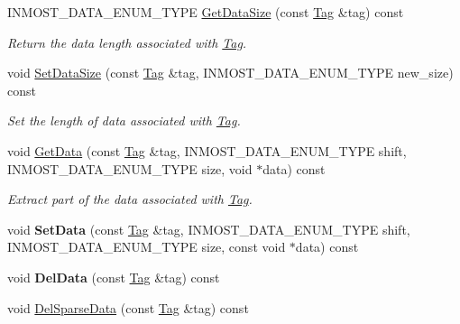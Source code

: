 \begin{DoxyCompactItemize}
\item 
I\-N\-M\-O\-S\-T\-\_\-\-D\-A\-T\-A\-\_\-\-E\-N\-U\-M\-\_\-\-T\-Y\-P\-E \hyperlink{classINMOST_1_1Storage_a0c416b8e55014921426055508deca124}{Get\-Data\-Size} (const \hyperlink{classINMOST_1_1Tag}{Tag} \&tag) const 
\begin{DoxyCompactList}\small\item\em Return the data length associated with \hyperlink{classINMOST_1_1Tag}{Tag}. \end{DoxyCompactList}\item 
void \hyperlink{classINMOST_1_1Storage_af834468fb65cd43e272502985c050820}{Set\-Data\-Size} (const \hyperlink{classINMOST_1_1Tag}{Tag} \&tag, I\-N\-M\-O\-S\-T\-\_\-\-D\-A\-T\-A\-\_\-\-E\-N\-U\-M\-\_\-\-T\-Y\-P\-E new\-\_\-size) const 
\begin{DoxyCompactList}\small\item\em Set the length of data associated with \hyperlink{classINMOST_1_1Tag}{Tag}. \end{DoxyCompactList}\item 
void \hyperlink{classINMOST_1_1Storage_ae5dc4f3507b7f327fb29ae48311a4eea}{Get\-Data} (const \hyperlink{classINMOST_1_1Tag}{Tag} \&tag, I\-N\-M\-O\-S\-T\-\_\-\-D\-A\-T\-A\-\_\-\-E\-N\-U\-M\-\_\-\-T\-Y\-P\-E shift, I\-N\-M\-O\-S\-T\-\_\-\-D\-A\-T\-A\-\_\-\-E\-N\-U\-M\-\_\-\-T\-Y\-P\-E size, void $\ast$data) const 
\begin{DoxyCompactList}\small\item\em Extract part of the data associated with \hyperlink{classINMOST_1_1Tag}{Tag}. \end{DoxyCompactList}\item 
\hypertarget{classINMOST_1_1Storage_aeb8cae6a4325c80da00fe9c9befaf300}{void {\bfseries Set\-Data} (const \hyperlink{classINMOST_1_1Tag}{Tag} \&tag, I\-N\-M\-O\-S\-T\-\_\-\-D\-A\-T\-A\-\_\-\-E\-N\-U\-M\-\_\-\-T\-Y\-P\-E shift, I\-N\-M\-O\-S\-T\-\_\-\-D\-A\-T\-A\-\_\-\-E\-N\-U\-M\-\_\-\-T\-Y\-P\-E size, const void $\ast$data) const }\label{classINMOST_1_1Storage_aeb8cae6a4325c80da00fe9c9befaf300}

\item 
\hypertarget{classINMOST_1_1Storage_a1e09e97adc4e172ebef2738b3ee1e2e6}{void {\bfseries Del\-Data} (const \hyperlink{classINMOST_1_1Tag}{Tag} \&tag) const }\label{classINMOST_1_1Storage_a1e09e97adc4e172ebef2738b3ee1e2e6}

\item 
\hypertarget{classINMOST_1_1Storage_a9bea3510b025f9083dbccd1fbdb94607}{void \hyperlink{classINMOST_1_1Storage_a9bea3510b025f9083dbccd1fbdb94607}{Del\-Sparse\-Data} (const \hyperlink{classINMOST_1_1Tag}{Tag} \&tag) const }\label{classINMOST_1_1Storage_a9bea3510b025f9083dbccd1fbdb94607}


\end{DoxyCompactItemize}
